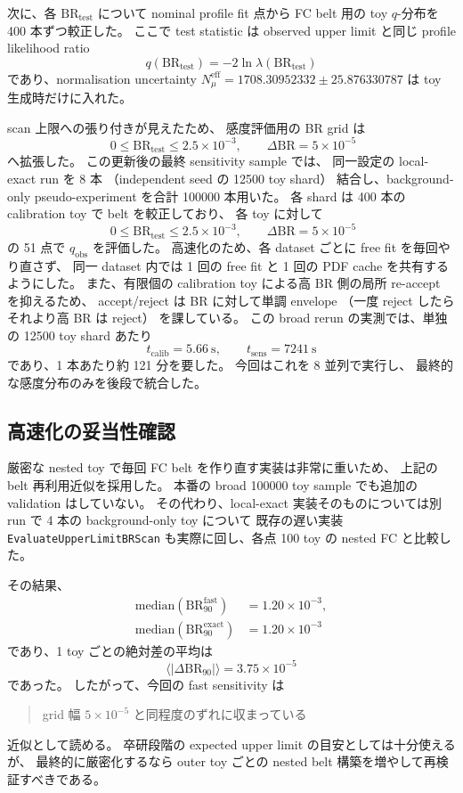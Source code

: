 \documentclass[a4paper,11pt]{jsarticle}
\begin{document}
次に、各 \(\mathrm{BR}_{\mathrm{test}}\) について nominal profile fit 点から
FC belt 用の toy \(q\)-分布を 400 本ずつ較正した。
ここで test statistic は observed upper limit と同じ
profile likelihood ratio
\[
q(\mathrm{BR}_{\mathrm{test}})
=-2\ln\lambda(\mathrm{BR}_{\mathrm{test}})
\]
であり、normalisation uncertainty
\(
N_\mu^{\mathrm{eff}}=1708.30952332\pm25.876330787
\)
は toy 生成時だけに入れた。

scan 上限への張り付きが見えたため、
感度評価用の BR grid は
\[
\;0 \le \mathrm{BR}_{\mathrm{test}} \le 2.5\times10^{-3},
\qquad
\Delta\mathrm{BR}=5\times10^{-5}
\]
へ拡張した。
この更新後の最終 sensitivity sample では、
同一設定の local-exact run を 8 本
（independent seed の 12500 toy shard）
結合し、background-only pseudo-experiment を合計 100000 本用いた。
各 shard は 400 本の calibration toy で belt を較正しており、
各 toy に対して
\[
\;0 \le \mathrm{BR}_{\mathrm{test}} \le 2.5\times10^{-3},
\qquad
\Delta\mathrm{BR}=5\times10^{-5}
\]
の 51 点で \(q_{\mathrm{obs}}\) を評価した。
高速化のため、各 dataset ごとに free fit を毎回やり直さず、
同一 dataset 内では 1 回の free fit と 1 回の PDF cache を共有するようにした。
また、有限個の calibration toy による高 BR 側の局所 re-accept を抑えるため、
accept/reject は BR に対して単調 envelope
（一度 reject したらそれより高 BR は reject）
を課している。
この broad rerun の実測では、単独の 12500 toy shard あたり
\[
t_{\mathrm{calib}} = 5.66\ \mathrm{s},\qquad
t_{\mathrm{sens}} = 7241\ \mathrm{s}
\]
であり、1 本あたり約 121 分を要した。
今回はこれを 8 並列で実行し、
最終的な感度分布のみを後段で統合した。

\subsection{高速化の妥当性確認}
厳密な nested toy で毎回 FC belt を作り直す実装は非常に重いため、
上記の belt 再利用近似を採用した。
本番の broad 100000 toy sample でも追加の validation はしていない。
その代わり、local-exact 実装そのものについては別 run で 4 本の background-only toy について
既存の遅い実装
\texttt{EvaluateUpperLimitBRScan}
も実際に回し、各点 100 toy の nested FC と比較した。

その結果、
\begin{align}
\mathrm{median}(\mathrm{BR}_{90}^{\mathrm{fast}}) &= 1.20\times10^{-3},\\
\mathrm{median}(\mathrm{BR}_{90}^{\mathrm{exact}}) &= 1.20\times10^{-3}
\end{align}
であり、1 toy ごとの絶対差の平均は
\[
\langle |\Delta \mathrm{BR}_{90}| \rangle = 3.75\times10^{-5}
\]
であった。
したがって、今回の fast sensitivity は
\begin{quote}
grid 幅 \(5\times10^{-5}\) と同程度のずれに収まっている
\end{quote}
近似として読める。
卒研段階の expected upper limit の目安としては十分使えるが、
最終的に厳密化するなら outer toy ごとの nested belt 構築を増やして再検証すべきである。
\end{document}
